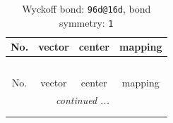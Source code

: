 \documentclass[fleqn,8pt]{jsarticle}
\begin{document}
\renewcommand{\arraystretch}{1.2}
\begin{longtable}{cccc}
\caption{Wyckoff bond: {\tt 96d@16d}, bond symmetry: {\tt 1}}
 \\
 \hline \hline
No. & vector & center & mapping \\ \hline \endfirsthead

\multicolumn{3}{l}{\tablename\ \thetable{}} \\
 \hline \hline
No. & vector & center & mapping \\ \hline \endhead

 \hline \hline
\multicolumn{3}{r}{\footnotesize\it continued ...} \\ \endfoot

 \hline \hline
\multicolumn{3}{r}{} \\ \endlastfoot


\end{longtable}
\end{document}

